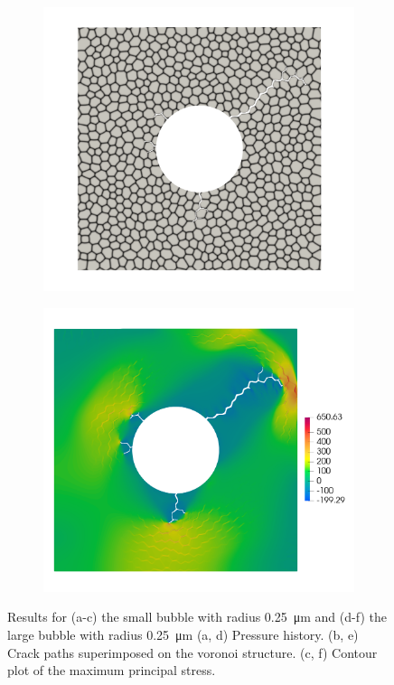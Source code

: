 \begin{figure}[htb!]
\begin{subfigure}[t]{0.32\linewidth}
    \caption{}
  \end{subfigure}
  \begin{subfigure}[t]{0.32\linewidth}
    \centering
    \includegraphics[width=\linewidth]{Chapter3/figures/r5_ext0}
    \caption{}
  \end{subfigure}
  \begin{subfigure}[t]{0.32\linewidth}
    \centering
    \includegraphics[width=\linewidth]{Chapter3/figures/r5_ext0_stress}
    \caption{}
  \end{subfigure}
  \caption{Results for (a-c) the small bubble with radius \SI{0.25}{\micro\meter} and (d-f) the large bubble with radius \SI{0.25}{\micro\meter} (a, d) Pressure history. (b, e) Crack paths superimposed on the voronoi structure. (c, f) Contour plot of the maximum principal stress.}
  \label{fig:r25}
\end{figure}

